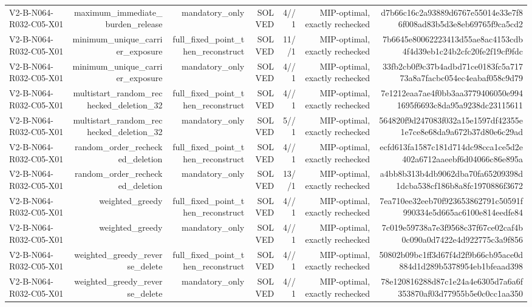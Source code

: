 {\begin{longtable}{lrrrrrr}
V2-B-N064-R032-C05-X01 & maximum\_immediate\_burden\_release & mandatory\_only & SOLVED & 4//1 & MIP-optimal, exactly rechecked & d7b66c16c2a93889d6767e55014e33e7f86f008ad83b5d3e8eb69765f9ca5cd2 \\
V2-B-N064-R032-C05-X01 & minimum\_unique\_carrier\_exposure & full\_fixed\_point\_then\_reconstruct & SOLVED & 11//1 & MIP-optimal, exactly rechecked & 7b6645e80062223413d55ae8ac4153cdb4f4d39eb1c24b2cfc20fe2f19cf9fdc \\
V2-B-N064-R032-C05-X01 & minimum\_unique\_carrier\_exposure & mandatory\_only & SOLVED & 4//1 & MIP-optimal, exactly rechecked & 33fb2cb0f9c37b4adbd71ce0183fc5a71773a8a7facbc054ec4eabaf058c9d79 \\
V2-B-N064-R032-C05-X01 & multistart\_random\_rechecked\_deletion\_32 & full\_fixed\_point\_then\_reconstruct & SOLVED & 4//1 & MIP-optimal, exactly rechecked & 7e1212eaa7ae4f0bb3aa3779406050e9941695f6693c8da95a9238dc23115611 \\
V2-B-N064-R032-C05-X01 & multistart\_random\_rechecked\_deletion\_32 & mandatory\_only & SOLVED & 5//1 & MIP-optimal, exactly rechecked & 564820f9d247083f032a15e1597df42355e1e7ce8e68da9a672b37d80e6c29ad \\
V2-B-N064-R032-C05-X01 & random\_order\_rechecked\_deletion & full\_fixed\_point\_then\_reconstruct & SOLVED & 4//1 & MIP-optimal, exactly rechecked & ecfd613fa1587c181d714dc98cca1ce5d2e402a6712aaeebf6d04066c86e895a \\
V2-B-N064-R032-C05-X01 & random\_order\_rechecked\_deletion & mandatory\_only & SOLVED & 13//1 & MIP-optimal, exactly rechecked & a4bb8b313b4db9062dba70fa65209398d1dcba538cf186b8a8fc1970886f3672 \\
V2-B-N064-R032-C05-X01 & weighted\_greedy & full\_fixed\_point\_then\_reconstruct & SOLVED & 4//1 & MIP-optimal, exactly rechecked & 7ea710ee32eeb70f923653862791c50591f990334e5d665ac6100e814eedfe84 \\
V2-B-N064-R032-C05-X01 & weighted\_greedy & mandatory\_only & SOLVED & 4//1 & MIP-optimal, exactly rechecked & 7c019e59738a7e3f9568c37f67ce02caf4b0c090a0d7422e4d922775c3a9f856 \\
V2-B-N064-R032-C05-X01 & weighted\_greedy\_reverse\_delete & full\_fixed\_point\_then\_reconstruct & SOLVED & 4//1 & MIP-optimal, exactly rechecked & 50802b09bc1ff3d67f4d2f9b66cb95ace0d884d1d289b5378954eb1bfeaad398 \\
V2-B-N064-R032-C05-X01 & weighted\_greedy\_reverse\_delete & mandatory\_only & SOLVED & 4//1 & MIP-optimal, exactly rechecked & 78e120816288d87c1e24a4e6305d7a6a6f353870af03d77955b5e0c0cc1aa350 \\

\end{longtable}}
